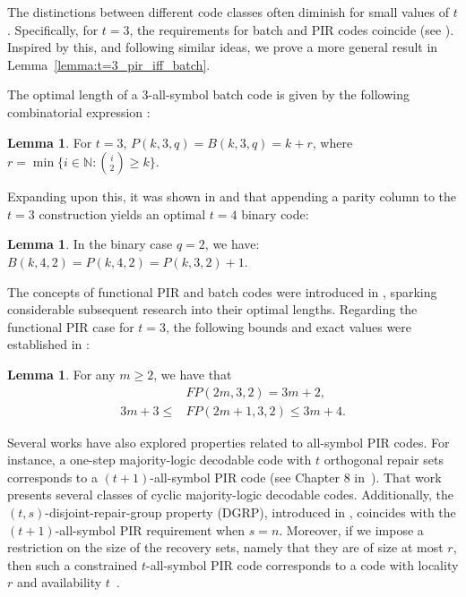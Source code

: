 \documentclass[11pt,a4paper]{article}
\theoremstyle{definition}
\newtheorem{lemma}[theorem]{Lemma}
\begin{document}
The distinctions between different code classes often 
diminish for small values of $t$. Specifically, for 
$t=3$, the requirements for batch and PIR codes 
coincide (see \cite[Lemmas 3 and 4]{VARDY_YAAKOBI_2016}). Inspired by this, and following similar ideas, we prove a more general result in Lemma~\ref{lemma:t=3_pir_iff_batch}.

The optimal length of a 3-all-symbol batch code
is given by the following combinatorial expression
\cite{FAZELI2015, fazeli2015codes, 
KARINGULA_VARDY_WOOTTERS2022, Vardy2016}:

\begin{lemma}\label{lem:B=P=k+r_For_t=3}
    For $t=3$, $P(k,3,q) = B(k,3,q) = k + r$, 
    where $r = \min\{i \in \mathbb{N} : \binom{i}{2} \geq k\}$.
\end{lemma}

Expanding upon this, it was shown in 
\cite{vardy2023private} and \cite{FAZELI2015} that 
appending a parity column to the $t=3$ construction 
yields an optimal $t=4$ binary code:

\begin{lemma}\label{lem:B=P=k+r_For_t=4}
   In the binary case $q=2$, we have: 
   $B(k,4,2) = P(k,4,2) = P(k,3,2) + 1$.
\end{lemma}

The concepts of functional PIR and batch codes were 
introduced in \cite{YAAKOBI2020}, sparking 
considerable subsequent research into their 
optimal lengths. Regarding the functional PIR case 
for $t=3$, the following bounds and exact values 
were established in \cite[Corollary 16]{YAAKOBI2020}: 
\begin{lemma}\label{lem:FP_for_t=3}
 For any $m \geq 2$, we have that  \begin{align*}
     &FP(2m,3,2) = 3m + 2,\\
     3m + 3 \leq &FP(2m + 1,3,2) \leq 3m + 4.
 \end{align*}  
\end{lemma}

Several works have also explored properties related to 
all-symbol PIR codes. For instance, a one-step majority-logic 
decodable code with $t$ orthogonal repair sets 
corresponds to a $(t+1)$-all-symbol PIR code (see 
Chapter 8 in~\cite{lin2001error}). That work presents several classes of cyclic majority-logic decodable codes.  Additionally, the 
$(t,s)$-disjoint-repair-group property (DGRP), 
introduced in \cite{KARINGULA_VARDY_WOOTTERS2022}, 
coincides with the $(t+1)$-all-symbol PIR requirement when $s=n$. Moreover, if we impose a restriction on the size of the recovery sets, namely that they are of size at most $r$, then such a constrained $t$-all-symbol PIR code corresponds to a code with locality $r$ and availability $t$~\cite{RAWAT2016}.
\end{document}
